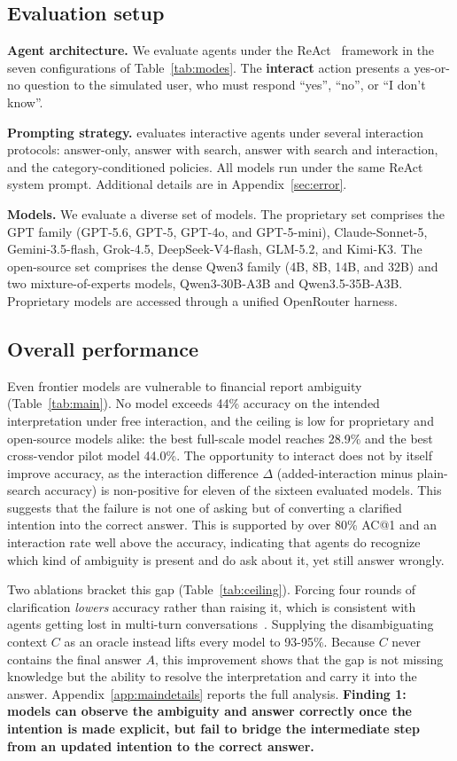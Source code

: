 \subsection{Evaluation setup}
\textbf{Agent architecture.} We evaluate agents under the ReAct~\citep{yao2023react} framework in the seven configurations of Table~\ref{tab:modes}. The \textbf{interact} action presents a yes-or-no question to the simulated user, who must respond ``yes'', ``no'', or ``I don't know''.

\textbf{Prompting strategy.} \fininteract evaluates interactive agents under several interaction protocols: answer-only, answer with search, answer with search and interaction, and the category-conditioned policies. All models run under the same ReAct system prompt. Additional details are in Appendix~\ref{sec:error}.

\textbf{Models.} We evaluate a diverse set of models. The proprietary set comprises the GPT family (GPT-5.6, GPT-5, GPT-4o, and GPT-5-mini), Claude-Sonnet-5, Gemini-3.5-flash, Grok-4.5, DeepSeek-V4-flash, GLM-5.2, and Kimi-K3. The open-source set comprises the dense Qwen3 family (4B, 8B, 14B, and 32B) and two mixture-of-experts models, Qwen3-30B-A3B and Qwen3.5-35B-A3B. Proprietary models are accessed through a unified OpenRouter harness.

\subsection{Overall performance}
\label{sec:ceiling}
Even frontier models are vulnerable to financial report ambiguity (Table~\ref{tab:main}). No model exceeds 44\% accuracy on the intended interpretation under free interaction, and the ceiling is low for proprietary and open-source models alike: the best full-scale model reaches 28.9\% and the best cross-vendor pilot model 44.0\%. The opportunity to interact does not by itself improve accuracy, as the interaction difference $\Delta$ (added-interaction minus plain-search accuracy) is non-positive for eleven of the sixteen evaluated models. This suggests that the failure is not one of asking but of converting a clarified intention into the correct answer. This is supported by over 80\% AC@1 and an interaction rate well above the accuracy, indicating that agents do recognize which kind of ambiguity is present and do ask about it, yet still answer wrongly. 

Two ablations bracket this gap (Table~\ref{tab:ceiling}). Forcing four rounds of clarification \emph{lowers} accuracy rather than raising it, which is consistent with agents getting lost in multi-turn conversations~\citep{laban2026llms}. Supplying the disambiguating context $C$ as an oracle instead lifts every model to 93-95\%. Because $C$ never contains the final answer $A$, this improvement shows that the gap is not missing knowledge but the ability to resolve the interpretation and carry it into the answer. Appendix~\ref{app:maindetails} reports the full analysis. \textbf{Finding 1: models can observe the ambiguity and answer correctly once the intention is made explicit, but fail to bridge the intermediate step from an updated intention to the correct answer.}

